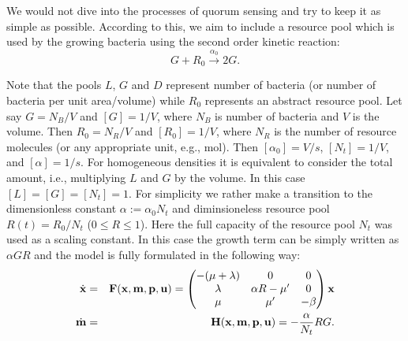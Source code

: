 \documentclass[10pt,A4paper]{article}
\begin{document}
We would not dive into the processes of quorum sensing and try to keep it as simple as possible.
According to this, we aim to include a resource pool which is used by the growing bacteria using the second order kinetic reaction:
\begin{equation}
    G + R_0  \stackrel{\alpha_0}{\longrightarrow} 2G.
\end{equation}

Note that the pools $L$, $G$ and $D$ represent number of bacteria (or number of bacteria per unit area/volume) while $R_0$ represents an abstract resource pool. 
Let say $G=N_B/V$ and $[G]=1/V$, where $N_B$ is number of bacteria and $V$ is the volume. 
Then $R_0=N_R/V$ and $[R_0]=1/V$, where $N_R$ is the number of resource molecules (or any appropriate unit, e.g., mol). 
Then $[\alpha_0]=V/s$, $[N_t]=1/V$, and $[\alpha]=1/s$. 
For homogeneous densities it is equivalent to consider the total amount, i.e., multiplying $L$ and $G$ by the volume. 
In this case $[L]=[G]=[N_t]=1$.
For simplicity we rather make a transition to the dimensionless constant $\alpha:=\alpha_0 N_t$ and diminsioneless resource pool $R(t) = R_0 / N_t$ ($0 \leqslant R \leqslant 1$).
Here the full capacity of the resource pool $N_t$ was used as a scaling constant.
In this case the growth term can be simply written as $\alpha G R$ and the model is fully formulated in the following way: 
\begin{eqnarray}
    \dot {\mathbf{x}}  &=& \mathbf{F}(\mathbf{x}, \mathbf{m}, \mathbf{p}, \mathbf{u}) = \begin{pmatrix}
                                                    -(\mu + \lambda) & 0               & 0      \\
                                                    \lambda          & \alpha R - \mu' & 0      \\
                                                    \mu              & \mu'            & -\beta 
                                                \end{pmatrix} \mathbf{x}  \\
    \dot {\mathbf{m}} &=& \mathbf{H} (\mathbf{x}, \mathbf{m}, \mathbf{p}, \mathbf{u}) = -\frac{\alpha}{N_t} R G.
\end{eqnarray}
\end{document}
